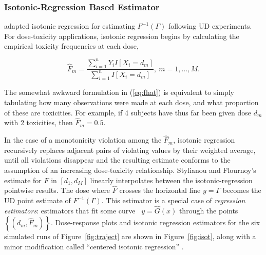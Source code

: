 \subsubsection{Isotonic-Regression Based Estimator}

\cite{Styl:Flou:dose:2002} adapted isotonic regression \citep{BBBB:order:1972} for estimating $F^{-1}(\Gamma)$ following UD experiments. For dose-toxicity applications, isotonic regression begins by calculating the empirical toxicity frequencies at each dose,

\begin{equation}\label{eq:fhat}
\hat{F}_m=\frac{\sum_{i=1}^n Y_iI\left[X_i=d_m\right]}{\sum_{i=1}^n I\left[X_i=d_m\right]},\ m=1,\ldots,M.
\end{equation}

The somewhat awkward formulation in (\ref{eq:fhat}) is equivalent to simply tabulating how many observations were made at each dose, and what proportion of these are toxicities. For example, if 4 subjects have thus far been given dose $d_m$ with 2 toxicities, then $\hat{F}_m=0.5$.

In the case of a monotonicity violation among the $\hat{F}_m$, isotonic regression recursively replaces adjacent pairs of violating values by their weighted average, until all violations disappear and the resulting estimate conforms to the assumption of an increasing dose-toxicity relationship. Stylianou and Flournoy's estimate for $F$ in $[d_1,d_M]$ linearly interpolates between the isotonic-regression pointwise results. The dose where $\hat{F}$ crosses the horizontal line $y=\Gamma$ becomes the UD point estimate of $F^{-1}(\Gamma)$. This estimator is a special case of \emph{regression estimators}: estimators that fit some curve \ $y=\hat{G}(x)$ through the points $\left\{\left(d_m,\hat{F}_m\right)\right\}$.  Dose-response plots and isotonic regression estimators for the six simulated runs of Figure~\ref{fig:traject} are shown in Figure~\ref{fig:isot}, along with a minor modification called ``centered isotonic regression'' \citep[Section~3.3]{Oron07}.

